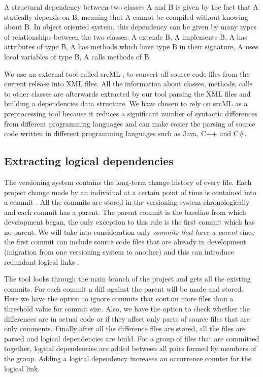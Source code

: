 \documentclass[conference]{IEEEtran}
\begin{document}
A structural dependency between two classes A and B is given by the fact that A statically depends on B, meaning that A cannot be compiled without knowing about B. In object oriented system, this dependency can be given by many types of relationships between the two classes: A extends B, A implements B, A has attributes of type B, A has methods which have type B in their signature, A uses local variables of type B, A calls methods of B.


 We use an external tool called srcML \cite{2003:XLC:851042.857028},
\cite{Collard:2011:LTF:2067850.2068011} to convert all source code files from the current release into XML files. All the information about classes, methods, calls to other classes are afterwards extracted by our tool parsing the XML files and building a dependencies data structure. We have chosen to rely on srcML as a preprocessing tool because it reduces a significant number of syntactic differences from different programming languages and can make easier the parsing of source code written in different programming languages such as Java, C++ and C\#.    

\subsection{Extracting logical dependencies}

The versioning system contains the long-term change history of every file. Each project change made by an individual at a certain point of time is contained into a commit \cite{svn}. All the commits are stored in the versioning system chronologically and each commit has a parent. The parent commit is the baseline from which development began, the only exception to this rule is the first commit which has no parent. We will take into consideration only \textit{commits that have a parent} since the first commit can include source code files that are already in development (migration from one versioning system to another) and this can introduce redundant logical links \cite{DBLP:journals/jss/AjienkaC17}. 

The tool looks through the main branch of the project and gets all the existing commits. For each commit a diff against the parent will be made and stored. Here we have the option to ignore commits that contain more files than a threshold value for commit size. Also, we have the option to check whether the differences are in actual code or if they affect only parts of source files that are only comments.  Finally after all the difference files are stored, all the files are parsed and logical dependencies are build. For a group of files that are committed together, logical dependencies are added between all pairs formed by members of the group. Adding a logical dependency increases an occurrence counter for the logical link. 
\end{document}
